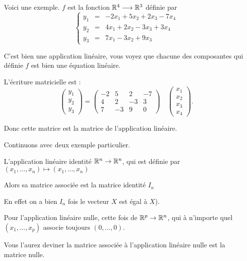 \diapo

Voici une exemple.
$f$ est la fonction $\mathbb{R}^4 \longrightarrow \mathbb{R}^3$ définie par
$$\left\{\begin{array}{rcl}
y_1 & = & -2x_1 + 5x_2 + 2x_3 - 7x_4\\
y_2 & = & 4x_1 + 2x_2 - 3x_3 + 3x_4\\
y_3 & = & 7x_1 - 3x_2 + 9x_3  
\end{array}\right.$$

C'est bien une application linéaire, vous voyez que chacune des composantes 
qui définie $f$ est bien une équation linéaire.

L'écriture matricielle est :
$$\begin{pmatrix} y_1\\ y_2\\ y_3 \end{pmatrix} =
\begin{pmatrix}
-2 & 5 & 2 & -7\\
4 & 2 & -3 & 3\\
7 & -3 & 9 & 0  
\end{pmatrix}\quad
\begin{pmatrix}x_1\\ x_2\\ x_3\\ x_4 \end{pmatrix}.$$


Donc cette matrice est la matrice de l'application linéaire.


\diapo

Continuons avec deux exemple particulier.


L'application linéaire identité $\mathbb{R}^n \to \mathbb{R}^n$, 
qui est définie par  $(x_1,\ldots,x_n) \mapsto (x_1,\ldots,x_n)$

Alors sa matrice associée est la matrice identité $I_n$ 

En effet on a bien $I_n$ fois le vecteur $X$ est égal à $X$).
  
\change

Pour l'application linéaire nulle, cette fois de $\mathbb{R}^p \to \mathbb{R}^n$, 
qui à n'importe quel $(x_1,\ldots,x_p)$ associe toujours $(0,\ldots,0)$.

Vous l'aurez deviner la matrice associée à l'application linéaire nulle
est la matrice nulle.

\diapo

